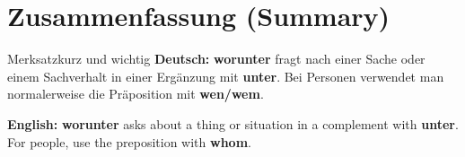\documentclass[a4paper,11pt]{article}
\newcommand{\GermanText}[1]{\textbf{Deutsch: }#1\par}
\newcommand{\EnglishText}[1]{{\small\color{SoftGray}\textbf{English: }#1\par}}
\begin{document}
\section{Zusammenfassung (Summary)}
\begin{grammarentry}{Merksatz}{kurz und wichtig}
\GermanText{\textbf{worunter} fragt nach einer Sache oder einem Sachverhalt in einer Ergänzung mit \textbf{unter}. Bei Personen verwendet man normalerweise die Präposition mit \textbf{wen/wem}.}
\EnglishText{\textbf{worunter} asks about a thing or situation in a complement with \textbf{unter}. For people, use the preposition with \textbf{whom}.}
\end{grammarentry}
\end{document}
